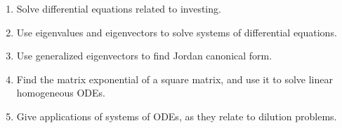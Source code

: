 
\begin{enumerate}

\item Solve differential equations related to investing.
\item Use eigenvalues and eigenvectors to solve systems of differential equations.
\item Use generalized eigenvectors to find Jordan canonical form.
\item Find the matrix exponential of a square matrix, and use it to solve linear homogeneous ODEs. 
\item Give applications of systems of ODEs, as they relate to dilution problems. 

\end{enumerate}
